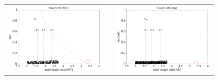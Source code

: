 \documentclass[11pt,a4paper,oneside,onecolumn]{jreport}
\begin{document}
\begin{figure}[H]
\begin{tabular}{ccc}
\begin{minipage}[t]{0.45\hsize}
\centering
\includegraphics[width=8cm]{./image/asteroid_ecc_100kyr.pdf}
\end{minipage} &
\begin{minipage}[t]{0.1\hsize}
\end{minipage} &
\begin{minipage}[t]{0.45\hsize}
\centering
\includegraphics[width=8cm]{./image/asteroid_inc_100kyr.pdf}
\end{minipage}\\
%
\end{tabular}
\caption{\label{fig:asteroid_ecc_inc_100kyr}}
\end{figure}
\end{document}
